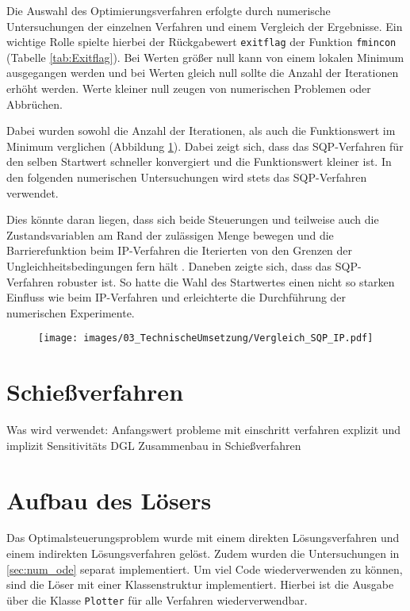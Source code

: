 Die Auswahl des Optimierungsverfahren erfolgte durch numerische Untersuchungen der einzelnen Verfahren und einem Vergleich der Ergebnisse. Ein wichtige Rolle spielte hierbei der Rückgabewert \texttt{exitflag} der Funktion \texttt{fmincon} (Tabelle \ref{tab:Exitflag}). Bei Werten größer null kann von einem lokalen Minimum ausgegangen werden und bei Werten gleich null sollte die Anzahl der Iterationen erhöht werden. Werte kleiner null zeugen von numerischen Problemen oder Abbrüchen.

 Dabei wurden sowohl die Anzahl der Iterationen, als auch die Funktionswert im Minimum verglichen (Abbildung \ref{img:Vergleich_SQP_IP}). Dabei zeigt sich, dass das SQP-Verfahren für den selben Startwert schneller konvergiert und die Funktionswert kleiner ist. In den folgenden numerischen Untersuchungen wird stets das SQP-Verfahren verwendet.

Dies könnte daran liegen, dass sich beide Steuerungen und teilweise auch die Zustandsvariablen am Rand der zulässigen Menge bewegen und die Barrierefunktion beim IP-Verfahren die Iterierten von den Grenzen der Ungleichheitsbedingungen fern hält \cite{Matlab2016}. Daneben zeigte sich, dass das SQP-Verfahren robuster ist. So hatte die Wahl des Startwertes einen nicht so starken Einfluss wie beim IP-Verfahren und erleichterte die Durchführung der numerischen Experimente. 

\begin{figure}[H]
    \begin{center}
        \texttt{[image: images/03\_TechnischeUmsetzung/Vergleich\_SQP\_IP.pdf]}
         \label{img:Vergleich_SQP_IP}
    \end{center}
\end{figure}

\section{Schießverfahren}

Was wird verwendet:
Anfangswert probleme mit einschritt verfahren explizit und implizit
Sensitivitäts DGL
Zusammenbau in Schießverfahren


\section{Aufbau des Lösers}
Das Optimalsteuerungsproblem wurde mit einem direkten Lösungsverfahren und einem indirekten Lösungsverfahren gelöst. Zudem wurden die Untersuchungen in \autoref{sec:num_ode} separat implementiert. Um viel Code wiederverwenden zu können, sind die Löser mit einer Klassenstruktur implementiert. Hierbei ist die Ausgabe über die Klasse \verb+Plotter+ für alle Verfahren wiederverwendbar.

